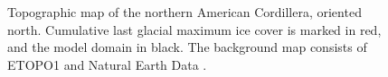 \documentclass{article}
\begin{document}
\begin{figure}
  \centering
  \caption{Topographic map of the northern American Cordillera, oriented north.
           Cumulative last glacial maximum ice cover \citep{Dyke.2004} is
           marked in red, and the model domain in black.
           The background map consists of ETOPO1 \citep{Amante.Eakins.2009}
           and Natural Earth Data \citep{Patterson.Kelso.2014}.}
  \label{fig:map-cordillera}
\end{figure}
\end{document}

